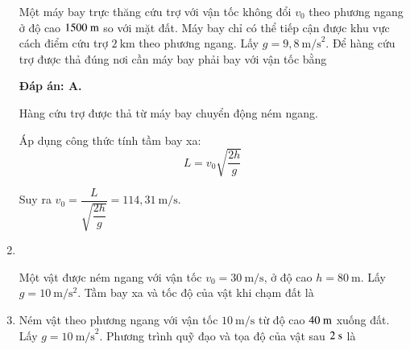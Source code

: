 \begin{enumerate}[label=\bfseries Câu \arabic*:,leftmargin=1.5cm]
	
	{Một máy bay trực thăng cứu trợ với vận tốc không đổi $v_0$ theo phương ngang ở độ cao $1500\ \text m$ so với mặt đất. Máy bay chỉ có thể tiếp cận được khu vực cách điểm cứu trợ $2\ \text{km}$ theo phương ngang. Lấy $g=9,8\ \text {m/s}^2$. Để hàng cứu trợ được thả đúng nơi cần máy bay phải bay với vận tốc bằng
	}
	
	\hideall
	{	\textbf{Đáp án: A.}
		
		Hàng cứu trợ được thả từ máy bay chuyển động ném ngang.
		
		Áp dụng công thức tính tầm bay xa:
		\[L=v_0\sqrt{\dfrac{2h}{g}}\]
		
		Suy ra $v_0 = \dfrac{L}{\sqrt{\dfrac{2h}{g}}}=114,31\ \text{m/s}$.
	}

\item {}\\
{Một vật được ném ngang với vận tốc $v_0 = \SI{30}{\meter/\second}$, ở độ cao $h = \SI{80}{\meter}$. Lấy $g=\SI{10}{\meter/\second^2}$. Tầm bay xa và tốc độ của vật khi chạm đất là
}
	
	\item {}
	
	
	{Ném vật theo phương ngang với vận tốc $10\ \text{m/s}$ từ độ cao $40\ \text m$ xuống đất. Lấy $g=10\ \text{m/s}^2$. Phương trình quỹ đạo và tọa độ của vật sau $2\ \text s$ là
	}
	

\end{enumerate}
